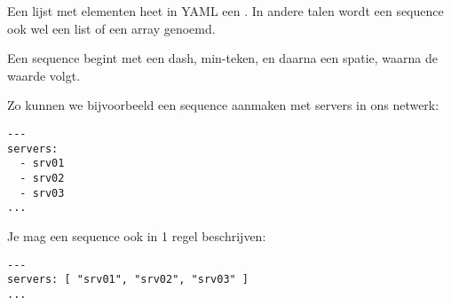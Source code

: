 Een lijst met elementen heet in YAML een . In andere talen wordt een sequence ook wel een list of een array genoemd.

Een sequence begint met een dash, min-teken, en daarna een spatie, waarna de waarde volgt.

Zo kunnen we bijvoorbeeld een sequence aanmaken met servers in ons netwerk:
\begin{verbatim}
---
servers:
  - srv01
  - srv02
  - srv03
...
\end{verbatim}

Je mag een sequence ook in 1 regel beschrijven:
\begin{verbatim}
---
servers: [ "srv01", "srv02", "srv03" ]
...
\end{verbatim}

